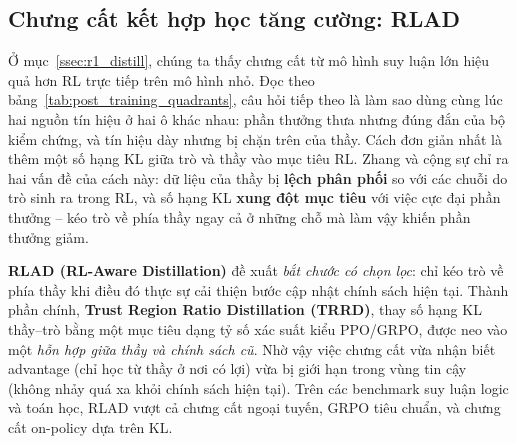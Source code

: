 \subsection{Chưng cất kết hợp học tăng cường: RLAD}
\label{ssec:rlad}

Ở mục~\ref{ssec:r1_distill}, chúng ta thấy chưng cất từ mô hình suy luận lớn hiệu quả hơn RL trực tiếp trên mô hình nhỏ. Đọc theo bảng~\ref{tab:post_training_quadrants}, câu hỏi tiếp theo là làm sao dùng cùng lúc hai nguồn tín hiệu ở hai ô khác nhau: phần thưởng thưa nhưng đúng đắn của bộ kiểm chứng, và tín hiệu dày nhưng bị chặn trên của thầy. Cách đơn giản nhất là thêm một số hạng KL giữa trò và thầy vào mục tiêu RL. Zhang và cộng sự \cite{zhang2026rlad} chỉ ra hai vấn đề của cách này: dữ liệu của thầy bị \textbf{lệch phân phối} so với các chuỗi do trò sinh ra trong RL, và số hạng KL \textbf{xung đột mục tiêu} với việc cực đại phần thưởng -- kéo trò về phía thầy ngay cả ở những chỗ mà làm vậy khiến phần thưởng giảm.

\textbf{RLAD (RL-Aware Distillation)} đề xuất \emph{bắt chước có chọn lọc}: chỉ kéo trò về phía thầy khi điều đó thực sự cải thiện bước cập nhật chính sách hiện tại. Thành phần chính, \textbf{Trust Region Ratio Distillation (TRRD)}, thay số hạng KL thầy--trò bằng một mục tiêu dạng tỷ số xác suất kiểu PPO/GRPO, được neo vào một \emph{hỗn hợp giữa thầy và chính sách cũ}. Nhờ vậy việc chưng cất vừa nhận biết advantage (chỉ học từ thầy ở nơi có lợi) vừa bị giới hạn trong vùng tin cậy (không nhảy quá xa khỏi chính sách hiện tại). Trên các benchmark suy luận logic và toán học, RLAD vượt cả chưng cất ngoại tuyến, GRPO tiêu chuẩn, và chưng cất on-policy dựa trên KL.


